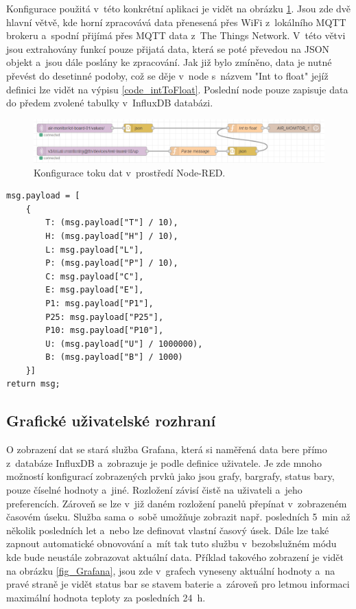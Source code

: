Konfigurace použitá v~této konkrétní aplikaci je vidět na obrázku \ref{fig_NodeRED}. Jsou zde dvě hlavní větvě, kde horní zpracovává data přenesená přes WiFi z~lokálního MQTT brokeru a~spodní přijímá přes MQTT data z~The Things Network. V~této větvi jsou extrahovány funkcí pouze přijatá data, která se poté převedou na JSON objekt a~jsou dále poslány ke zpracování. Jak již bylo zmíněno, data je nutné převést do desetinné podoby, což se děje v~node s~názvem "Int to float"{} jejíž definici lze vidět na výpisu \ref{code_intToFloat}. Poslední node pouze zapisuje data do předem zvolené tabulky v~InfluxDB databázi.

\begin{figure}[h]
    \centering
    \includegraphics[width=\textwidth]{obrazky/nodered.png}
    \caption{Konfigurace toku dat v~prostředí Node-RED.}
    \label{fig_NodeRED}
\end{figure}

\noindent
\begin{minipage}{\linewidth}
\begin{lstlisting}[caption={Funkce pro převod naměřených dat do desetinné podoby.}, label={code_intToFloat}]
msg.payload = [
    {
        T: (msg.payload["T"] / 10),
        H: (msg.payload["H"] / 10),
        L: msg.payload["L"],
        P: (msg.payload["P"] / 10),
        C: msg.payload["C"],
        E: msg.payload["E"],
        P1: msg.payload["P1"],
        P25: msg.payload["P25"],
        P10: msg.payload["P10"],
        U: (msg.payload["U"] / 1000000),
        B: (msg.payload["B"] / 1000)
    }]
return msg;
\end{lstlisting}
\end{minipage}

\subsection{Grafické uživatelské rozhraní}

O zobrazení dat se stará služba Grafana, která si naměřená data bere přímo z~databáze InfluxDB a~zobrazuje je podle definice uživatele. Je zde mnoho možností konfigurací zobrazených prvků jako jsou grafy, bargrafy, status bary, pouze číselné hodnoty a~jiné. Rozložení závisí čistě na uživateli a~jeho preferencích. Zároveň se lze v~již daném rozložení panelů přepínat v~zobrazeném časovém úseku. Služba sama o~sobě umožňuje zobrazit např. posledních \SI{5}{\minute} až několik posledních let a~nebo lze definovat vlastní časový úsek. Dále lze také zapnout automatické obnovování a~mít tak tuto službu v~bezobslužném módu kde bude neustále zobrazovat aktuální data. Příklad takového zobrazení je vidět na obrázku \ref{fig_Grafana}, jsou zde v~grafech vyneseny aktuální hodnoty a~na pravé straně je vidět status bar se stavem baterie a~zároveň pro letmou informaci maximální hodnota teploty za posledních \SI{24}{\hour}.

